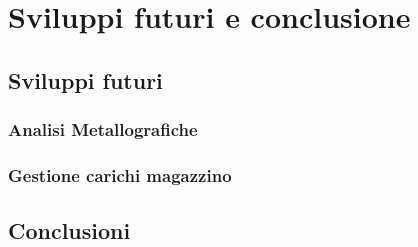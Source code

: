 \chapter{Sviluppi futuri e conclusione}
  \label{chapter_sviluppi_futuri_conclusione}
  \section{Sviluppi futuri}
  \subsection{Analisi Metallografiche}
  \subsection{Gestione carichi magazzino}
  \section{Conclusioni}
